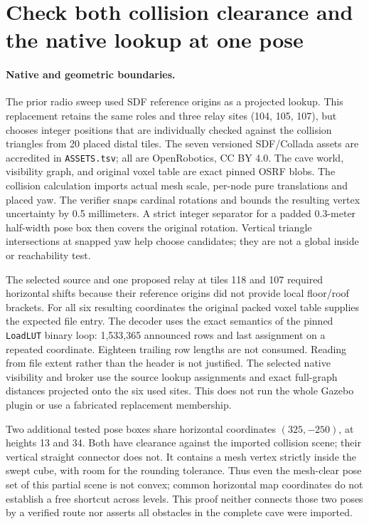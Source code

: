 \documentclass{article}
\begin{document}
\section*{Check both collision clearance and the native lookup at one pose}
\paragraph{Native and geometric boundaries.}
The prior radio sweep used SDF reference origins as a projected
lookup. This replacement retains the same roles and three relay sites
(104, 105, 107), but chooses integer positions that are individually
checked against the collision triangles from 20 placed distal tiles.
The seven versioned SDF/Collada assets are accredited in
\texttt{ASSETS.tsv}; all are OpenRobotics, CC BY 4.0. The cave world,
visibility graph, and original voxel table are exact pinned OSRF
blobs. The collision calculation imports actual mesh scale,
per-node pure translations and placed yaw. The verifier snaps
cardinal rotations and bounds the resulting vertex uncertainty
by 0.5 millimeters. A strict integer separator for a padded
0.3-meter half-width pose box then covers the original rotation.
Vertical triangle intersections at snapped yaw help choose
candidates; they are not a global inside or reachability test.

The selected source and one proposed relay at tiles 118 and 107
required horizontal shifts because their reference origins did not
provide local floor/roof brackets. For all six resulting coordinates
the original packed voxel table supplies the expected file entry.
The decoder uses the exact semantics of the pinned
\texttt{LoadLUT} binary loop: 1,533,365 announced rows and
last assignment on a repeated coordinate. Eighteen trailing row
lengths are not consumed. Reading from file extent rather than the
header is not justified. The selected native visibility and broker
use the source lookup assignments and exact full-graph distances
projected onto the six used sites. This does not run the whole
Gazebo plugin or use a fabricated replacement membership.

Two additional tested pose boxes share horizontal coordinates
$(325,-250)$, at heights 13 and 34. Both have clearance against
the imported collision scene; their vertical straight connector
does not. It contains a mesh vertex strictly inside the swept
cube, with room for the rounding tolerance. Thus even the
mesh-clear pose set of this partial scene is not convex; common
horizontal map coordinates do not establish a free shortcut across
levels. This proof neither connects those two poses by a verified
route nor asserts all obstacles in the complete cave were imported.
\end{document}
